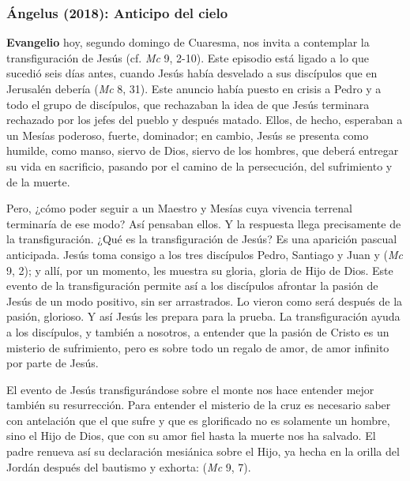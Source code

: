 \subsubsection{Ángelus (2018): Anticipo del cielo}


\begin{body}
 \textbf{Evangelio} hoy, segundo domingo de Cuaresma, nos invita a contemplar la transfiguración de Jesús (cf. \textit{Mc} 9, 2-10). Este episodio está ligado a lo que sucedió seis días antes, cuando Jesús había desvelado a sus discípulos que en Jerusalén debería  (\textit{Mc} 8, 31). Este anuncio había puesto en crisis a Pedro y a todo el grupo de discípulos, que rechazaban la idea de que Jesús terminara rechazado por los jefes del pueblo y después matado. Ellos, de hecho, esperaban a un Mesías poderoso, fuerte, dominador; en cambio, Jesús se presenta como humilde, como manso, siervo de Dios, siervo de los hombres, que deberá entregar su vida en sacrificio, pasando por el camino de la persecución, del sufrimiento y de la muerte.

Pero, ¿cómo poder seguir a un Maestro y Mesías cuya vivencia terrenal terminaría de ese modo? Así pensaban ellos. Y la respuesta llega precisamente de la transfiguración. ¿Qué es la transfiguración de Jesús? Es una aparición pascual anticipada. Jesús toma consigo a los tres discípulos Pedro, Santiago y Juan y  (\textit{Mc} 9, 2); y allí, por un momento, les muestra su gloria, gloria de Hijo de Dios. Este evento de la transfiguración permite así a los discípulos afrontar la pasión de Jesús de un modo positivo, sin ser arrastrados. Lo vieron como será después de la pasión, glorioso. Y así Jesús les prepara para la prueba. La transfiguración ayuda a los discípulos, y también a nosotros, a entender que la pasión de Cristo es un misterio de sufrimiento, pero es sobre todo un regalo de amor, de amor infinito por parte de Jesús.

El evento de Jesús transfigurándose sobre el monte nos hace entender mejor también su resurrección. Para entender el misterio de la cruz es necesario saber con antelación que el que sufre y que es glorificado no es solamente un hombre, sino el Hijo de Dios, que con su amor fiel hasta la muerte nos ha salvado. El padre renueva así su declaración mesiánica sobre el Hijo, ya hecha en la orilla del Jordán después del bautismo y exhorta:  (\textit{Mc} 9, 7).


\end{body}
